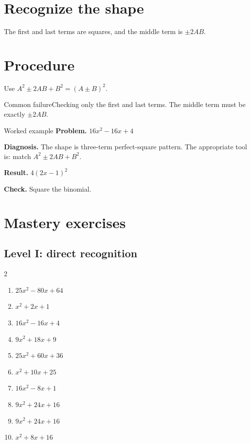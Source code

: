 \documentclass[11pt,oneside]{book}
\begin{document}
\section{Recognize the shape}
The first and last terms are squares, and the middle term is $\pm2AB$.
\section{Procedure}
Use $A^2\pm2AB+B^2=(A\pm B)^2$.

\begin{warningbox}{Common failure}Checking only the first and last terms. The middle term must be exactly $\pm2AB$.\end{warningbox}
\begin{examplebox}{Worked example}
\textbf{Problem.} $ 16 x^{2} - 16 x + 4 $

\textbf{Diagnosis.} The shape is three-term perfect-square pattern. The appropriate tool is: match $A^2\pm2AB+B^2$.

\textbf{Result.} $ 4 \left(2 x - 1\right)^{2} $

\textbf{Check.} Square the binomial.
\end{examplebox}
\section{Mastery exercises}
\subsection*{Level I: direct recognition}
\begin{multicols}{2}
\begin{enumerate}[leftmargin=*,label=\textbf{\arabic*.},itemsep=0.65\baselineskip]
\item $ 25 x^{2} - 80 x + 64 $
\item $ x^{2} + 2 x + 1 $
\item $ 16 x^{2} - 16 x + 4 $
\item $ 9 x^{2} + 18 x + 9 $
\item $ 25 x^{2} + 60 x + 36 $
\item $ x^{2} + 10 x + 25 $
\item $ 16 x^{2} - 8 x + 1 $
\item $ 9 x^{2} + 24 x + 16 $
\item $ 9 x^{2} + 24 x + 16 $
\item $ x^{2} + 8 x + 16 $
\end{enumerate}
\end{multicols}
\end{document}
